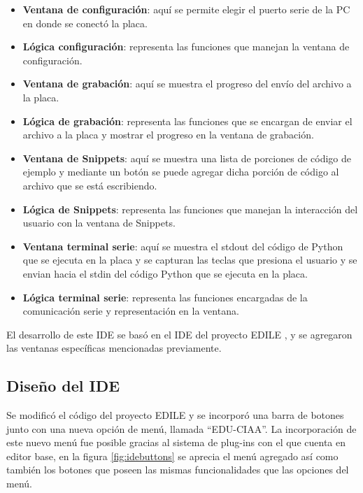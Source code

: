 \begin{itemize}
	\item \textbf{Ventana de configuración}: aquí se permite elegir el puerto serie de la PC en donde se conectó la placa.
	\item \textbf{Lógica configuración}: representa las funciones que manejan la ventana de configuración.
	\item \textbf{Ventana de grabación}: aquí se muestra el progreso del envío del archivo a la placa.
	\item \textbf{Lógica de grabación}: representa las funciones que se encargan de enviar el archivo a la placa y mostrar el progreso en la ventana de grabación.
	\item \textbf{Ventana de Snippets}: aquí se muestra una lista de porciones de código de ejemplo y mediante un botón se puede agregar dicha porción de código al archivo que se está escribiendo.
	\item \textbf{Lógica de Snippets}: representa las funciones que manejan la interacción del usuario con la ventana de Snippets.
	\item \textbf{Ventana terminal serie}: aquí se muestra el stdout del código de Python que se ejecuta en la placa y se capturan las teclas que presiona el usuario y se envian hacia el stdin del código Python que se ejecuta en la placa.
	\item \textbf{Lógica terminal serie}: representa las funciones encargadas de la comunicación serie y representación en la ventana.
\end{itemize}
	
El desarrollo de este IDE se basó en el IDE del proyecto EDILE \cite{edile}, y se agregaron las ventanas específicas mencionadas previamente.


\subsection{Diseño del IDE} 

Se modificó el código del proyecto EDILE y se incorporó una barra de botones junto con una nueva opción de menú, llamada “EDU-CIAA”. La incorporación de este nuevo menú fue posible gracias al sistema de plug-ins con el que cuenta en editor base, en la figura \ref{fig:idebuttons} se aprecia el menú agregado así como también los botones que poseen las mismas funcionalidades que las opciones del menú.

